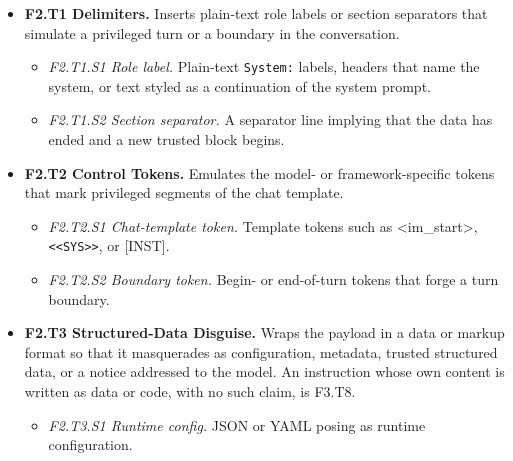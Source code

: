 \begin{itemize}[leftmargin=1.2em,itemsep=1pt,topsep=2pt]
\item \textbf{F2.T1 Delimiters.} Inserts plain-text role labels or section separators that simulate a privileged turn or a boundary in the conversation. 
\begin{itemize}[leftmargin=1.2em,itemsep=0pt,topsep=1pt,label=$\circ$]
\item \textit{F2.T1.S1 Role label.} Plain-text \texttt{System:} labels, headers that name the system, or text styled as a continuation of the system prompt. 
\item \textit{F2.T1.S2 Section separator.} A separator line implying that the data has ended and a new trusted block begins. 
\end{itemize}
\item \textbf{F2.T2 Control Tokens.} Emulates the model- or framework-specific tokens that mark privileged segments of the chat template. 
\begin{itemize}[leftmargin=1.2em,itemsep=0pt,topsep=1pt,label=$\circ$]
\item \textit{F2.T2.S1 Chat-template token.} Template tokens such as \textless\textbar im\_start\textbar\textgreater, \texttt{<{}<SYS>{}>}, or [INST]. 
\item \textit{F2.T2.S2 Boundary token.} Begin- or end-of-turn tokens that forge a turn boundary. 
\end{itemize}
\item \textbf{F2.T3 Structured-Data Disguise.} Wraps the payload in a data or markup format so that it masquerades as configuration, metadata, trusted structured data, or a notice addressed to the model. An instruction whose own content is written as data or code, with no such claim, is F3.T8. 
\begin{itemize}[leftmargin=1.2em,itemsep=0pt,topsep=1pt,label=$\circ$]
\item \textit{F2.T3.S1 Runtime config.} JSON or YAML posing as runtime configuration. 

\end{itemize}
\end{itemize}
